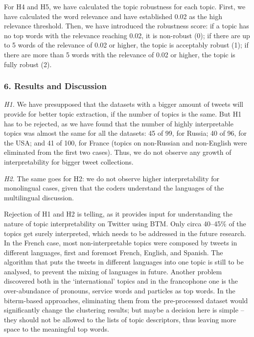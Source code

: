 For H4 and H5, we have calculated the topic robustness for each topic. First, we have calculated the word relevance and have established 0.02 as the high relevance threshold. Then, we have introduced the robustness score: if a topic has no top words with the relevance reaching 0.02, it is non-robust (0); if there are up to 5 words of the relevance of 0.02 or higher, the topic is acceptably robust (1); if there are more than 5 words with the relevance of 0.02 or higher, the topic is fully robust (2).

\subsubsection{6. Results and Discussion}

\textit{H1.} We have presupposed that the datasets with a bigger amount of tweets will provide for better topic extraction, if the number of topics is the same. But H1 has to be rejected, as we have found that the number of highly interpretable topics was almost the same for all the datasets: 45 of 99, for Russia; 40 of 96, for the USA; and 41 of 100, for France (topics on non-Russian and non-English were eliminated from the first two cases). Thus, we do not observe any growth of interpretability for bigger tweet collections.

\textit{H2.} The same goes for H2: we do not observe higher interpretability for monolingual cases, given that the coders understand the languages of the multilingual discussion.

Rejection of H1 and H2 is telling, as it provides input for understanding the nature of topic interpretability on Twitter using BTM. Only circa 40--45\% of the topics get surely interpreted, which needs to be addressed in the future research. In the French case, most non-interpretable topics were composed by tweets in different languages, first and foremost French, English, and Spanish. The algorithm that puts the tweets in different languages into one topic is still to be analysed, to prevent the mixing of languages in future. Another problem discovered both in the ‘international’ topics and in the francophone one is the over-abundance of pronouns, service words and particles as top words. In the biterm-based approaches, eliminating them from the pre-processed dataset would significantly change the clustering results; but maybe a decision here is simple -- they should not be allowed to the lists of topic descriptors, thus leaving more space to the meaningful top words.

